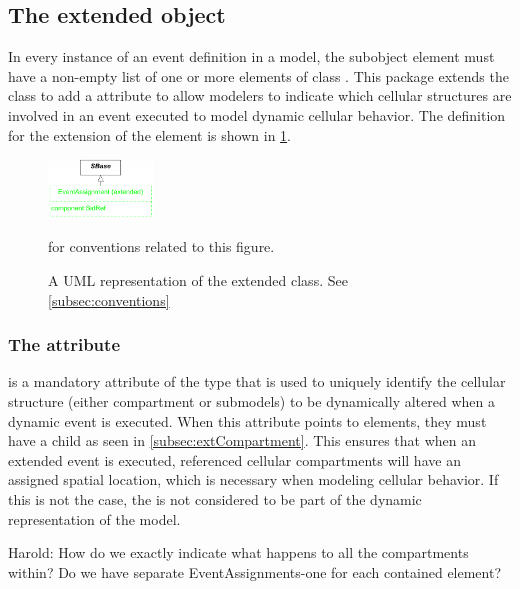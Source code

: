 \subsection{The extended  object}
\label{subsec:extEventAssignment}

In every instance of an event definition in a model, the subobject \ListOfEventAssignments element must have a non-empty list of one or more elements of class \EventAssignment. This package extends the \EventAssignment class to add a  attribute to allow modelers to indicate which cellular structures are involved in an event executed to model dynamic cellular behavior. The definition for the extension of the \EventAssignment element is shown in \ref{fig:UMLExtendedEventAssignment}.
 
\begin{figure}[tbhp]
	\centering
	\includegraphics[width=0.25\textwidth]{images/UMLExtendedEventAssignment.pdf}\\
	\caption{A UML representation of the extended \EventAssignment class. See \ref{subsec:conventions}} for conventions related to this figure. \label{fig:UMLExtendedEventAssignment}
\end{figure}

\subsubsection{The  attribute}
\label{attr:component}

 is a mandatory attribute of the type  that is used to uniquely identify the cellular structure (either compartment or submodels) to be dynamically altered when a dynamic event is executed. When this attribute points to \Compartment elements, they must have a child \ListOfCoordinateComponents as seen in \ref{subsec:extCompartment}. This ensures that when an extended event is executed, referenced cellular compartments will have an assigned spatial location, which is necessary when modeling cellular behavior. If this is not the case, the \EventAssignment is not considered to be part of the dynamic representation of the model.

{\color{red} Harold: \notice How do we exactly indicate what happens to all the compartments within? Do we have separate EventAssignments-one for each contained element?}

